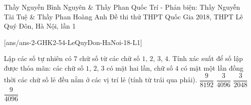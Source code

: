 \begin{name}
		{Thầy Nguyễn Bình Nguyên \& Thầy Phan Quốc Trí - Phản biện: Thầy Nguyễn Tài Tuệ \& Thầy Phan Hoàng Anh}
		{Đề thi thử THPT Quốc Gia 2018, THPT Lê Quý Đôn, Hà Nội, lần 1}
	\end{name}
	\setcounter{ex}{0}
	[ans/ans-2-GHK2-54-LeQuyDon-HaNoi-18-L1]
\begin{ex}%
	Lập các số tự nhiên có $7$ chữ số từ các chữ số $1$, $2$, $3$, $4$. Tính xác suất để số lập được thỏa mãn: các chữ số $1$, $2$, $3$ có mặt hai lần, chữ số $4$ có mặt một lần đồng thời các chữ số lẻ đều nằm ở các vị trí lẻ (tính từ trái qua phải).
	\choice
	{\True $\dfrac{9}{8192}$}
	{$\dfrac{3}{4096}$}
	{$\dfrac{3}{2048}$}
	{$\dfrac{9}{4096}$}
\end{ex}
